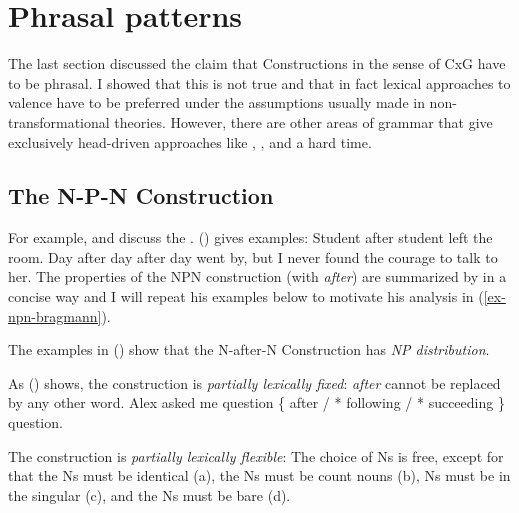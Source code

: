 \documentclass[output=paper]{langsci/langscibook}
\begin{document}
\citet{Goldberg96a,Goldberg2006a,GJ2004a}
 
\citet{Mueller2006d,MWArgSt,MuellerLFGphrasal}

\section{Phrasal patterns}
\label{sec-phrasal-patterns}

The last section discussed the claim that Constructions in the sense of CxG have to be phrasal. I
showed that this is not true and that in fact lexical approaches to valence have to be preferred
under the assumptions usually made in non-transformational theories. However, there are other areas
of grammar that give exclusively head-driven approaches like \cg, \minimalism, and \dg a hard time.

\subsection{The N-P-N Construction}

For example, \citet{Matsuyama2004a-u} and \citet{Jackendoff2008a} discuss the . () gives examples:
\eal
\ex Student after student left the room.
\ex
\label{ex-npn-iteration}
Day after day after day went by, but I never found the courage to talk to
her. \citep{Bargmann2015a}
\zl
The properties of the NPN construction (with \emph{after})  are summarized by \citet{Bargmann2015a}
in a concise way and I will repeat his examples below to motivate his analysis in (\ref{ex-npn-bragmann}).

The examples in () show that the N-after-N Construction has \emph{NP distribution}.

As () shows, the construction is \emph{partially lexically fixed}: \emph{after} cannot be replaced by any other word.
\ea
Alex asked me question \{ after / * following / * succeeding \} question.
\z

The construction is \emph{partially lexically flexible}: The choice of Ns is free, except for that
the Ns must be identical (a), the Ns must be count nouns (b), Ns must be in the
singular (c), and the Ns must be bare (d).

\eal
\settowidth{}
\zl
\end{document}
